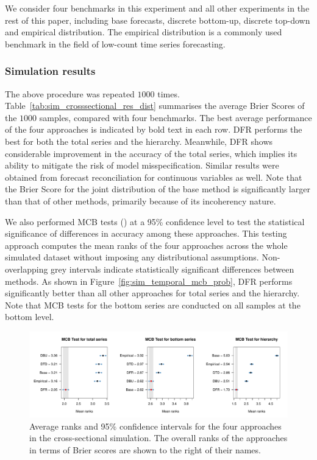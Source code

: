 \documentclass[a4paper,review,12pt,authoryear]{elsarticle}
\theoremstyle{definition}
\begin{document}
    We consider four benchmarks in this experiment and all other experiments in the rest of this paper, including base forecasts, discrete bottom-up, discrete top-down and empirical distribution. 
    The empirical distribution is a commonly used benchmark in the field of low-count time series forecasting.

    \subsubsection{Simulation results}
    The above procedure was repeated $1000$ times.
    Table~\ref{tab:sim_crosssectional_res_dist} summarises the average Brier Scores of the $1000$ samples, compared with four benchmarks.
    The best average performance of the four approaches is indicated by bold text in each row.
    DFR performs the best for both the total series and the hierarchy.
    Meanwhile, DFR shows considerable improvement in the accuracy of the total series, which implies its ability to mitigate the risk of model misspecification.
    Similar results were obtained from forecast reconciliation for continuous variables as well.
    Note that the Brier Score for the joint distribution of the base method is significantly larger than that of other methods, primarily because of its incoherency nature.

    We also performed MCB tests (\citealp{koningM3CompetitionStatistical2005}) at a 95\% confidence level to test the statistical significance of differences in accuracy among these approaches.
    This testing approach computes the mean ranks of the four approaches across the whole simulated dataset without imposing any distributional assumptions.
    Non-overlapping grey intervals indicate statistically significant differences between methods.
    As shown in Figure~\ref{fig:sim_temporal_mcb_prob}, DFR performs significantly better than all other approaches for total series and the hierarchy.
    Note that MCB tests for the bottom series are conducted on all samples at the bottom level.

    \begin{figure}
      \centering
      \label{fig:mcb_crosssectional}
      \caption{Average ranks and 95\% confidence intervals for the four approaches in the cross-sectional simulation. The overall ranks of the approaches in terms of Brier scores are shown to the right of their names.}
      \includegraphics[width=\textwidth]{figures/sim_cross_mcb.pdf}
    \end{figure}
\end{document}
